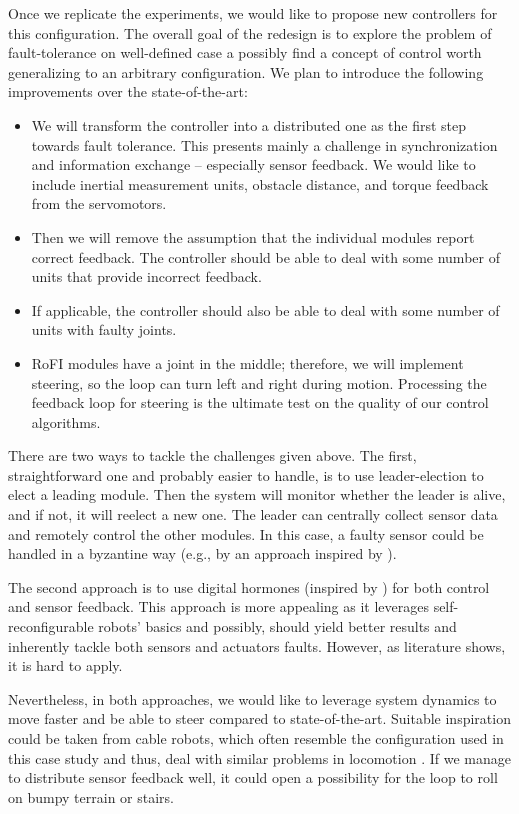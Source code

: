 Once we replicate the experiments, we would like to propose new controllers for
this configuration. The overall goal of the redesign is to explore the problem
of fault-tolerance on well-defined case a possibly find a concept of control
worth generalizing to an arbitrary configuration. We plan to introduce the
following improvements over the state-of-the-art:
\begin{itemize}
    \item We will transform the controller into a distributed one as the first
    step towards fault tolerance. This presents mainly a challenge in
    synchronization and information exchange -- especially sensor feedback. We
    would like to include inertial measurement units, obstacle distance, and
    torque feedback from the servomotors.
    \item Then we will remove the assumption that the individual
    modules report correct feedback. The controller should be able to deal with
    some number of units that provide incorrect feedback.
    \item If applicable, the controller should also be able to deal with some
    number of units with faulty joints.
    \item RoFI modules have a joint in the middle; therefore, we will implement
    steering, so the loop can turn left and right during motion. Processing the
    feedback loop for steering is the ultimate test on the quality of our
    control algorithms.
\end{itemize}

There are two ways to tackle the challenges given above. The first,
straightforward one and probably easier to handle, is to use leader-election
\cite{baca2016coordination} to elect a leading module. Then the system will
monitor whether the leader is alive, and if not, it will reelect a new one. The
leader can centrally collect sensor data and remotely control the
other modules. In this case, a faulty sensor could be handled in a byzantine way
(e.g., by an approach inspired by \textcite{DBLP:conf/osdi/CastroL99}).

The second approach is to use digital hormones (inspired by
\cite{DBLP:conf/cec/HamannSSC10, DBLP:conf/icra/MorenoG11}) for both control and
sensor feedback. This approach is more appealing as it leverages
self-reconfigurable robots' basics and possibly, should yield better results and
inherently tackle both sensors and actuators faults. However, as literature
shows, it is hard to apply.

Nevertheless, in both approaches, we would like to leverage system dynamics to
move faster and  be able to steer compared to state-of-the-art. Suitable
inspiration could be taken from cable robots, which often resemble the
configuration used in this case study and thus, deal with similar problems in
locomotion \cite{DBLP:conf/iros/Hustig-SchultzS16, DBLP:conf/iros/CeraA18}. If
we manage to distribute sensor feedback well, it could open a possibility for
the loop to roll on bumpy terrain or stairs.

